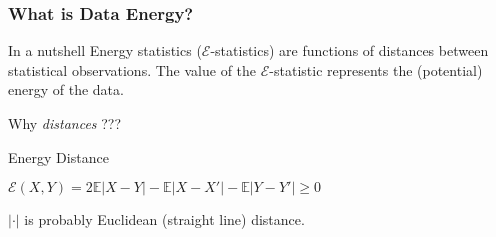 \documentclass[presentation]{beamer}
\begin{document}
\begin{frame}
  \frametitle{What is Data Energy?}
  \begin{centering}
    \begin{block}{In a nutshell}
      Energy statistics ($\mathcal{E}$-statistics) are functions of
      distances between statistical observations. The value of the
      $\mathcal{E}$-statistic represents the (potential) energy of the
      data.
    \end{block}
  \end{centering}
  \pause
  \begin{center}
    Why \textit{distances} ??? 
  \end{center}
\end{frame}


\begin{frame}
  \begin{block}{Energy Distance}
    \begin{center}
      $\mathcal{E}(X,Y) = 2\mathbb{E}|X - Y| - \mathbb{E}|X - X'| -
      \mathbb{E}|Y - Y'| \geq 0$
    \end{center}
  \end{block}
  \centering
  $|\cdot|$ is probably Euclidean (straight line) distance.
\end{frame}
\end{document}

